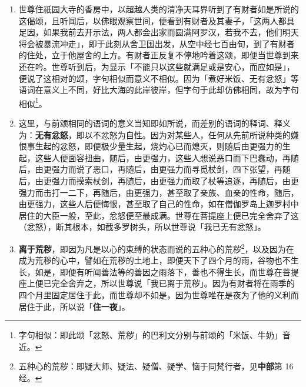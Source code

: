 \begin{enumerate}\item 世尊住祇园大寺的香房中，以超越人类的清净天耳界听到了有财者如是所说的这偈颂，且听闻后，以佛眼观察世间，便看到有财者及其妻子，「这两人都具足因，如果我前去开示法，两人都会出家而圆满阿罗汉，若我不去，他们明天将会被暴流冲走」，即于此刻从舍卫国出发，从空中经七百由旬，到了有财者的住处，立于他屋舍的上方。有财者正反复不停地吟着这颂，即便当世尊到来还在吟。世尊听到后，为显示「不能只以这些就满足或是安心，而应如是」，便说了这相对的颂，字句相似而意义不相似。因为「煮好米饭、无有忿怒」等语词在意义上不同，好比大海的此岸彼岸，但字句于此却仿佛相同，故为字句相似\footnote{字句相似：即此颂「忿怒、荒秽」的巴利文分别与前颂的「米饭、牛奶」音近。}。
\item 这里，与前颂相同的语词的意义当知即如所说，而差别的语词的释词、释义为：\textbf{无有忿怒}，即以不忿怒为自性。因为对某些人，任何从先前所说种类的嫌恨事生起的忿怒，即便极少量生起，烧灼心已而熄灭，则随后由更强力的生起，这些人便面容扭曲，随后，由更强力，这些人想说恶口而下巴蠢动，再随后，由更强力而说了恶口，再随后，由更强力而寻觅杖剑，四下张望，再随后，由更强力而摸索杖剑，再随后，由更强力而取了杖等追逐，再随后，由更强力而击打一二下，再随后，由更强力，甚至取了亲族、血亲的性命，随后，由更强力，这些人后便悔恨，甚至取了自己的性命，如在僧伽罗岛上迦罗村中居住的大臣一般，至此，忿怒便至最成满。世尊在菩提座上便已完全舍弃了这（忿怒），断其根本，如截多罗树头，所以世尊说「我已无有忿怒」。
\item \textbf{离于荒秽}，即因为凡是以心的束缚的状态而说的五种心的荒秽\footnote{五种心的荒秽：即疑大师、疑法、疑僧、疑学、恼于同梵行者，见\textbf{中部}第 16 经。}，以及因为在成为荒秽的心中，譬如在荒秽的土地上，即便天下了四个月的雨，谷物也不生长，如是，即便有听闻善法等的善因之雨落下，善也不得生长，而世尊在菩提座上便已完全舍弃之，所以世尊说「我已离于荒秽」。因为有财者将在雨季的四个月里固定居住于此，而世尊却不如是，因为世尊唯在是夜为了他的义利而居住于此，所以说「\textbf{住一夜}」。

\end{enumerate}

